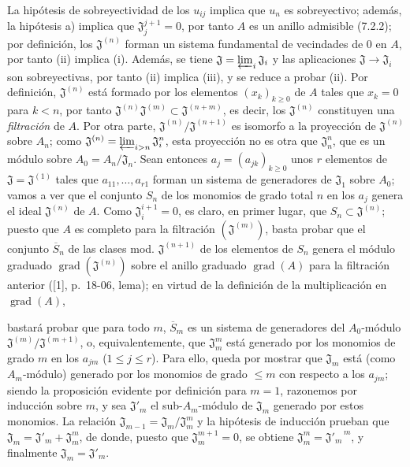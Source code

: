 La hipótesis de sobreyectividad de los $u_{ij}$ implica que $u_n$ es sobreyectivo;
además, la hipótesis a) implica que $\mathfrak J_j^{j+1}=0$, por tanto $A$ es
un anillo admisible (7.2.2); por definición, los $\mathfrak J^{(n)}$ forman
un sistema fundamental de vecindades de $0$ en $A$, por tanto (ii) implica (i).
Además, se tiene $\mathfrak J=\varprojlim_i\mathfrak J_i$ y las aplicaciones
$\mathfrak J\to\mathfrak J_i$ son sobreyectivas, por tanto (ii) implica (iii), y
se reduce a probar (ii). Por definición, $\mathfrak J^{(n)}$ está formado
por los elementos $(x_k)_{k\geq0}$ de $A$ tales que $x_k=0$ para $k<n$, por tanto
$\mathfrak J^{(n)}\mathfrak J^{(m)}\subset\mathfrak J^{(n+m)}$, es decir,
los $\mathfrak J^{(n)}$ constituyen una \emph{filtración} de $A$. Por otra
parte, $\mathfrak J^{(n)}/\mathfrak J^{(n+1)}$ es isomorfo a la proyección de
$\mathfrak J^{(n)}$ sobre $A_n$; como
$\mathfrak J^{(n)}=\varprojlim_{i>n}\mathfrak J_i^n$, esta proyección no es
otra que $\mathfrak J_n^n$, que es un módulo sobre
$A_0=A_n/\mathfrak J_n$. Sean entonces $a_j=(a_{jk})_{k\geq0}$ unos $r$ elementos de
$\mathfrak J=\mathfrak J^{(1)}$ tales que $a_{11},\ldots,a_{r1}$ forman un
sistema de generadores de $\mathfrak J_1$ sobre $A_0$; vamos a ver que
el conjunto $S_n$ de los monomios de grado total $n$ en los $a_j$ genera el ideal
$\mathfrak J^{(n)}$ de $A$. Como $\mathfrak J_i^{i+1}=0$, es claro, en primer
lugar, que $S_n\subset\mathfrak J^{(n)}$; puesto que $A$ es completo para la
filtración $(\mathfrak J^{(m)})$, basta probar que el conjunto
$\overline S_n$ de las clases mod. $\mathfrak J^{(n+1)}$ de los elementos de $S_n$
genera el módulo graduado $\operatorname{grad}(\mathfrak J^{(n)})$ sobre
el anillo graduado $\operatorname{grad}(A)$ para la filtración anterior
([1], p.~18-06, lema); en virtud de la definición de la multiplicación en
$\operatorname{grad}(A)$,


bastará probar que para todo $m$, $\overline S_m$ es un sistema de
generadores del $A_0$-módulo
$\mathfrak J^{(m)}/\mathfrak J^{(m+1)}$, o, equivalentemente, que $\mathfrak J_m^m$ está
generado por los monomios de grado $m$ en los $a_{jm}$ ($1\leq j\leq r$).
Para ello, queda por mostrar que $\mathfrak J_m$ está (como
$A_m$-módulo) generado por los monomios de grado $\leq m$ con respecto a los
$a_{jm}$; siendo la proposición evidente por definición para $m=1$,
razonemos por inducción sobre $m$, y sea $\mathfrak J'_m$ el sub-$A_m$-módulo
de $\mathfrak J_m$ generado por estos monomios. La relación
$\mathfrak J_{m-1}=\mathfrak J_m/\mathfrak J_m^m$ y la hipótesis de inducción
prueban que $\mathfrak J_m=\mathfrak J'_m+\mathfrak J_m^m$, de donde, puesto que
$\mathfrak J_m^{m+1}=0$, se obtiene
$\mathfrak J_m^m={\mathfrak J'_m}^{\,m}$, y finalmente
$\mathfrak J_m=\mathfrak J'_m$.

